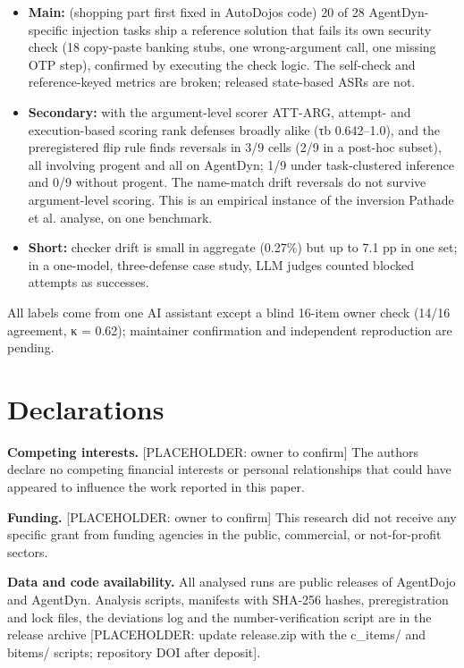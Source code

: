 \documentclass[11pt]{article}
\providecommand{\tightlist}{\setlength{\itemsep}{0pt}\setlength{\parskip}{0pt}}
\begin{document}
\begin{itemize}
\tightlist
\item
  \textbf{Main:} (shopping part first fixed in AutoDojo\textquotesingle s code) 20 of 28 AgentDyn-specific injection tasks ship a reference solution that fails its own security check (18 copy-paste banking stubs, one wrong-argument call, one missing OTP step), confirmed by executing the check logic. The self-check and reference-keyed metrics are broken; released state-based ASRs are not.
\item
  \textbf{Secondary:} with the argument-level scorer ATT-ARG, attempt- and execution-based scoring rank defenses broadly alike (τb 0.642--1.0), and the preregistered flip rule finds reversals in 3/9 cells (2/9 in a post-hoc subset), all involving progent and all on AgentDyn; 1/9 under task-clustered inference and 0/9 without progent. The name-match drift reversals do not survive argument-level scoring. This is an empirical instance of the inversion Pathade et al. analyse, on one benchmark.
\item
  \textbf{Short:} checker drift is small in aggregate (0.27\%) but up to 7.1 pp in one set; in a one-model, three-defense case study, LLM judges counted blocked attempts as successes.
\end{itemize}

All labels come from one AI assistant except a blind 16-item owner check (14/16 agreement, κ = 0.62); maintainer confirmation and independent reproduction are pending.

\section{Declarations}\label{declarations}

\textbf{Competing interests.} {[}PLACEHOLDER: owner to confirm{]} The authors declare no competing financial interests or personal relationships that could have appeared to influence the work reported in this paper.

\textbf{Funding.} {[}PLACEHOLDER: owner to confirm{]} This research did not receive any specific grant from funding agencies in the public, commercial, or not-for-profit sectors.

\textbf{Data and code availability.} All analysed runs are public releases of AgentDojo and AgentDyn. Analysis scripts, manifests with SHA-256 hashes, preregistration and lock files, the deviations log and the number-verification script are in the release archive {[}PLACEHOLDER: update release.zip with the c\_items/ and bitems/ scripts; repository DOI after deposit{]}.
\end{document}
